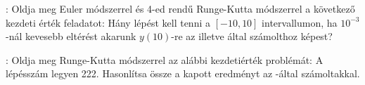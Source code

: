 :
Oldja meg Euler módszerrel és 4-ed rendű Runge-Kutta módszerrel a 
következő kezdeti érték feladatot:
Hány lépést kell tenni a $[-10,10]$ intervallumon, ha $10^{-3}$-nál kevesebb 
eltérést akarunk $y(10)$-re az  illetve  által számolthoz képest? 

: Oldja meg Runge-Kutta módszerrel az alábbi kezdetiérték problémát:
A lépésszám legyen 222. Hasonlítsa össze a kapott eredményt az 
-által számoltakkal.
